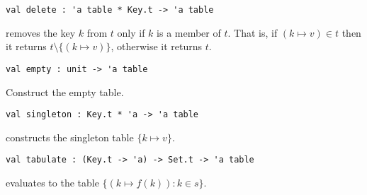 \begin{cluster}
\label{grp:grm:table-interface::delete}

\begin{gram}[delete]
\label{grm:table-interface::delete}
\begin{verbatim}
val delete : 'a table * Key.t -> 'a table
\end{verbatim}
 removes the key $k$ from $t$ only if $k$ is a member of $t$.
That is, if $(k \mapsto v) \in t$ then it returns
$t \setminus \{(k \mapsto v)\}$, otherwise it returns $t$.

\end{gram}
\end{cluster}

\begin{cluster}
\label{grp:grm:table-interface::empty}

\begin{gram}[empty]
\label{grm:table-interface::empty}
\begin{verbatim}
val empty : unit -> 'a table
\end{verbatim}
Construct the empty table.

\end{gram}
\end{cluster}

\begin{cluster}
\label{grp:gr:table-interface:singleton}

\begin{gram}[singleton]
\label{gr:table-interface:singleton}
\begin{verbatim}
val singleton : Key.t * 'a -> 'a table
\end{verbatim}
 constructs the singleton table $\{k \mapsto v\}$.

\end{gram}
\end{cluster}

\begin{cluster}
\label{grp:grm:table-interface::tabulate}

\begin{gram}[tabulate]
\label{grm:table-interface::tabulate}
\begin{verbatim}
val tabulate : (Key.t -> 'a) -> Set.t -> 'a table
\end{verbatim}
 evaluates to the table $\{(k \mapsto f(k)) : k \in s\}$.

\end{gram}
\end{cluster}


